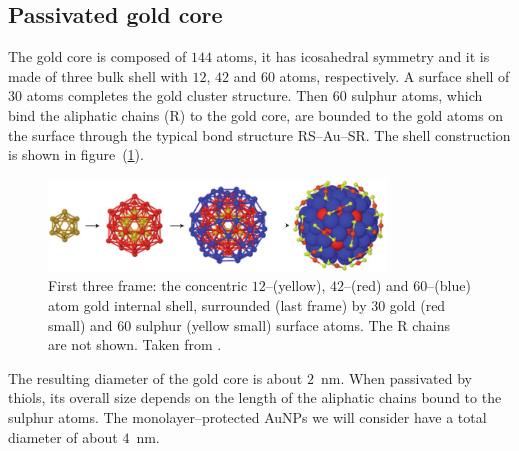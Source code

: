 \subsection{Passivated gold core}
The gold core is composed of $144$ atoms, it has icosahedral symmetry and it is made of three bulk shell with 
$12$, $42$ and $60$ atoms, respectively. A surface shell of $30$ atoms completes the gold cluster structure. Then 
$60$ sulphur atoms, which bind the aliphatic chains (R) to the gold core, are bounded to the gold atoms on the 
surface through the typical bond structure RS--Au--SR. The shell construction is shown in 
figure~(\ref{fig:goldShell}).
\begin{figure}[!ht]
	\centering
	\includegraphics[width=0.8\textwidth]{./img/goldShell}
	\caption{First three frame: the concentric $12$--(yellow), $42$--(red) and $60$--(blue) atom gold internal shell, surrounded (last frame) by $30$ gold (red small) and $60$ sulphur (yellow small) surface atoms. The R chains are not shown. Taken from \cite{corePassivated}.}
	\label{fig:goldShell}
\end{figure}

The resulting diameter of the gold core is about $2$~nm. When passivated by thiols, its overall size depends on 
the length of the aliphatic chains bound to the sulphur atoms. The monolayer--protected \acp{AuNP} we will 
consider have a total diameter of about $4$~nm.

